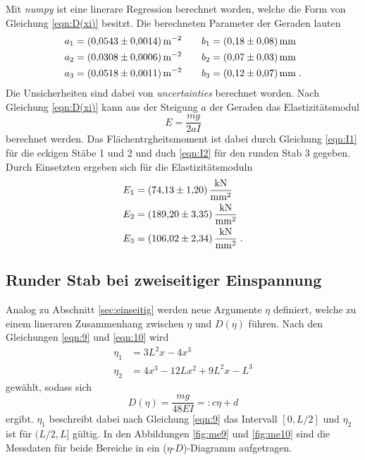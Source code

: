 \noindent Mit \textit{numpy}
\cite{numpy} ist eine linerare Regression berechnet worden, welche die Form von Gleichung \eqref{eqn:D(xi)} besitzt. Die berechneten
Parameter der Geraden lauten
\begin{align*}
    a_1&=\SI[per-mode=reciprocal]{0.0543 \pm 0.0014}{\per\square\metre} \qquad
    b_1=\SI{0.18   \pm 0.08}{\milli\metre}      \\
    a_2&=\SI[per-mode=reciprocal]{0.0308 \pm 0.0006}{\per\square\metre} \qquad
    b_2=\SI{0.07  \pm 0.03}  {\milli\metre}       \\
    a_3&=\SI[per-mode=reciprocal]{0.0518 \pm 0.0011}{\per\square\metre} \qquad
    b_3=\SI{0.12   \pm 0.07}   {\milli\metre}         \;.
\end{align*}
Die Unsicherheiten sind dabei von \textit{uncertainties} \cite{uncertainties} berechnet worden.
Nach Gleichung \eqref{eqn:D(xi)} kann aus der Steigung $a$ der Geraden das Elastizitätsmodul
\begin{equation}
    E=\frac{mg}{2aI}
    \label{eqn:E}
\end{equation}
berechnet werden. Das Flächentrgheitsmoment ist dabei durch Gleichung \eqref{eqn:I1} für die eckigen Stäbe 1 und 2 und duch \eqref{eqn:I2}
für den runden Stab 3 gegeben. Durch Einsetzten ergeben sich für die Elastizitätsmoduln
\begin{align*}
    E_1&=\SI{ 74.13 \pm 1.20}{\kilo\newton\per\square\milli\metre}\\
    E_2&=\SI{189.20 \pm 3.35}{\kilo\newton\per\square\milli\metre}\\
    E_3&=\SI{106.02 \pm 2.34}{\kilo\newton\per\square\milli\metre} \;.
\end{align*}

\subsection{Runder Stab bei zweiseitiger Einspannung}   
\label{sec:zweiseitig}
Analog zu Abschnitt \ref{sec:einseitig} werden neue Argumente $\eta$ definiert, welche zu einem lineraren Zusammenhang zwischen
$\eta$ und $D(\eta)$ führen. Nach den Gleichungen \eqref{eqn:9} und \eqref{eqn:10} wird
\begin{align*}
    \eta_1&=3L^2x-4x^3 \\
    \eta_2&=4x^3-12Lx^2+9L^2x-L^3
\end{align*}
gewählt, sodass sich
\begin{equation}
    D(\eta)=\frac{mg}{48EI}=:c\eta+d
\end{equation}
ergibt. $\eta_1$ beschreibt dabei nach Gleichung \eqref{eqn:9} das Intervall $[0,L/2]$ und $\eta_2$ ist für $(L/2,L]$ gültig. In den Abbildungen
\ref{fig:me9} und \ref{fig:me10} sind die Messdaten für beide Bereiche in ein ($\eta$-$D$)-Diagramm aufgetragen.

